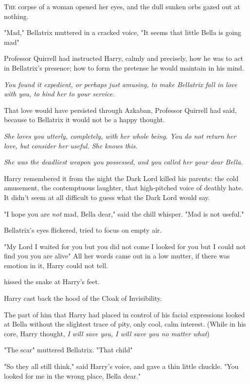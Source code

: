 
\lettrine{T}{he} corpse of a
woman opened her eyes, and the dull sunken orbs gazed out at nothing.

"Mad," Bellatrix muttered in a cracked voice, "It seems that little Bella is
going mad{\el}"

Professor Quirrell had instructed Harry, calmly and precisely, how he was to
act in Bellatrix's presence; how to form the pretense he would maintain in his
mind.

\emph{You found it expedient, or perhaps just amusing, to make Bellatrix fall
in love with you, to bind her to your service.}

That love would have persisted through Azkaban, Professor Quirrell had said,
because to Bellatrix it would not be a happy thought.

\emph{She loves you utterly, completely, with her whole being. You do not
return her love, but consider her useful. She knows this.}

\emph{She was the deadliest weapon you possessed, and you called her your dear
Bella.}
\pagebreak

Harry remembered it from the night the Dark Lord killed his parents: the cold
amusement, the contemptuous laughter, that high-pitched voice of deathly hate.
It didn't seem at all difficult to guess what the Dark Lord would say.

"I hope you are \emph{not} mad, Bella dear," said the chill whisper. "Mad is
not useful."

Bellatrix's eyes flickered, tried to focus on empty air.

"My{\el} Lord{\el} I waited for you but you did not come{\el} I looked
for you but I could not find you{\el} you are alive{\el}" All her words
came out in a low mutter, if there was emotion in it, Harry could not tell.

 hissed the snake at Harry's feet.

Harry cast back the hood of the Cloak of Invisibility.

The part of him that Harry had placed in control of his facial expressions
looked at Bella without the slightest trace of pity, only cool, calm interest.
(While in his core, Harry thought, \emph{I will save you, I will save you no
matter what{\el}})

"The scar{\el}" muttered Bellatrix. "That child{\el}"

"So they all still think," said Harry's voice, and gave a thin little chuckle.
"You looked for me in the wrong place, Bella dear."

